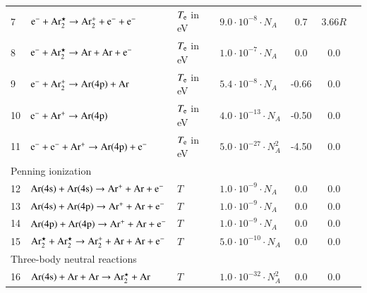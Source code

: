 \documentclass{warpdoc}
\begin{document}
\begin{table}[!ht]
\begin{threeparttable}
\begin{tabular*}{1.05\textwidth}{l@{\extracolsep{\fill}}lllccr}
   7  & $\rm e^- +Ar_2^\star \rightarrow Ar_2^+ + e^- + e^-$
       & $T_{\rm e}$ in eV
       & $9.0\cdot10^{-8}\cdot N_A$  
       &0.7
       &$3.66R$   
       & \cite{jof:2007:arakoni} \\

   8  & $\rm e^- +Ar_2^\star \rightarrow Ar + Ar + e^-$
       & $T_{\rm e}$ in eV
       & $1.0\cdot10^{-7}\cdot N_A$
                       &0.0
       &0.0   
       & \cite{jof:2007:arakoni} \\

   9  & $\rm e^- +Ar_2^+ \rightarrow Ar(4p) + Ar$
       & $T_{\rm e}$  in eV
       & $5.4\cdot10^{-8}\cdot N_A$
                   &-0.66
       &0.0   
       & \cite{jof:2007:arakoni} \\

          10  & $\rm e^- +Ar^+ \rightarrow Ar(4p) $
       & $T_{\rm e}$ in eV
       & $4.0\cdot10^{-13}\cdot N_A$
               &-0.50
       &0.0   
       & \cite{jof:2007:arakoni} \\

       
          11 & $\rm e^- + e^- +Ar^+ \rightarrow Ar(4p) + e^- $
       & $T_{\rm e}$ in eV
       & $5.0\cdot10^{-27}\cdot N_A^2$ 
        &-4.50
       &0.0   
       & \cite{jof:2007:arakoni} \\

   \midrule
\multicolumn{3}{p{3cm}}{Penning ionization} 
       & 
       & 
       & \\     
   \midrule

          12 & $\rm Ar(4s) + Ar(4s) \rightarrow Ar^+ +Ar + e^- $
       & $T$ 
       & $1.0\cdot10^{-9}\cdot N_A $    
       &0.0
       &0.0       
       & \cite{jof:2007:arakoni} \\

          13 & $\rm Ar(4s) + Ar(4p) \rightarrow Ar^+ +Ar + e^- $
       & $T$ 
       & $1.0\cdot10^{-9}\cdot N_A $    
       &0.0
       &0.0
       & \cite{jof:2007:arakoni} \\

          14 & $\rm Ar(4p) + Ar(4p) \rightarrow Ar^+ +Ar + e^- $
       & $T$ 
       & $1.0\cdot10^{-9}\cdot N_A $    
       &0.0
       &0.0   
       & \cite{jof:2007:arakoni} \\


          15 & $\rm Ar_2^\star + Ar_2^\star \rightarrow Ar_2^+ +Ar + Ar + e^- $
       & $T$ 
       & $5.0\cdot10^{-10}\cdot N_A $    
       &0.0
       &0.0 
       & \cite{ieee:2003:kannari} \\
          \midrule
\multicolumn{3}{p{3cm}}{Three-body neutral reactions} 
       & 
       & 
       & \\     
   \midrule
         16 & $\rm Ar(4s) + Ar + Ar \rightarrow Ar_2^\star +Ar $
       & $T$ 
       & $1.0\cdot10^{-32}\cdot N_A^2 $    
       &0.0
       &0.0     
       & \cite{jof:2007:arakoni} \\


\end{tabular*}
\end{threeparttable}
\end{table}
\end{document}
